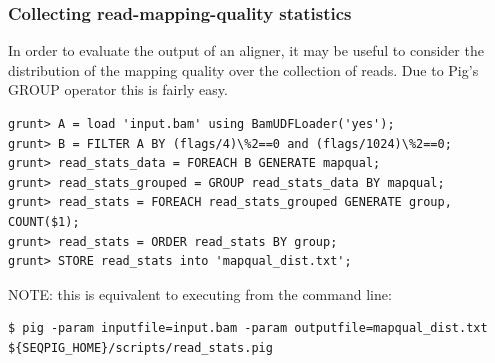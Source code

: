 \subsubsection{Collecting read-mapping-quality statistics}
In order to evaluate the output of an aligner, it may be useful to
consider the distribution of the mapping quality over the collection of
reads. Due to Pig's GROUP operator this is fairly easy.
\begin{lstlisting}
grunt> A = load 'input.bam' using BamUDFLoader('yes');
grunt> B = FILTER A BY (flags/4)\%2==0 and (flags/1024)\%2==0;
grunt> read_stats_data = FOREACH B GENERATE mapqual;
grunt> read_stats_grouped = GROUP read_stats_data BY mapqual;
grunt> read_stats = FOREACH read_stats_grouped GENERATE group, COUNT($1);
grunt> read_stats = ORDER read_stats BY group;
grunt> STORE read_stats into 'mapqual_dist.txt';
\end{lstlisting}
NOTE: this is equivalent to executing from the command line:
\begin{lstlisting}
$ pig -param inputfile=input.bam -param outputfile=mapqual_dist.txt ${SEQPIG_HOME}/scripts/read_stats.pig
\end{lstlisting}

